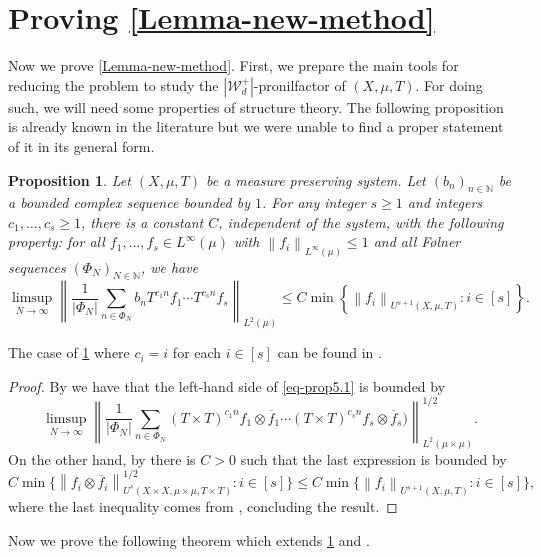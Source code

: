 \documentclass[letter,11pt]{article}
\newtheorem{prop}[theo]{Proposition}
\theoremstyle{definition}
\newcommand{\N}{\mathbb{N}}
\newcommand{\norm}[1]{\left\lVert#1\right\rVert}
\begin{document}
\section{Proving \cref{Lemma-new-method}}\label{sec5}
Now we prove \cref{Lemma-new-method}. First, we prepare the main tools for reducing the problem to study the $|\mathcal{W}_d^{+} |$-pronilfactor of $(X,\mu,T)$. For doing such, we will need some properties of structure theory. The following proposition is already known in the literature but we were unable to find a proper statement of it in its general form. 
\begin{prop}\label{W-erg-avera}
    Let $(X,\mu,T)$ be a measure preserving system. Let $(b_n)_{n\in \N}$ be a bounded complex sequence bounded by $1$. For any integer $s\geq 1$ and integers $c_1,\ldots,c_s\geq 1$, there is a constant $C$, independent of the system, with the following property: for all $f_1,\ldots,f_s\in L^\infty(\mu)$ with $\norm{f_i}_{L^\infty(\mu)}\leq 1$ and all F\o lner sequences $(\Phi_N)_{N\in \N}$, we have 
    \begin{equation}\label{eq-prop5.1}
      \limsup _{N \rightarrow \infty}\left\|\frac{1}{\left|\Phi_N\right|} \sum_{n \in \Phi_N} b_n T^{c_1 n} f_1 \cdots T^{c_s n} f_s\right\|_{L^2(\mu)} \leq C\min \left\{\left\|f_i\right\|_{U^{s+1}(X, \mu, T)}: i\in [s]\right\}.  
    \end{equation}
   $$ $$
\end{prop}
The case of \cref{W-erg-avera} where $c_i=i$ for each $i\in [s]$ can be found in \cite[Corollary 7.3]{MR2544760}.
\begin{proof}
By \cite[Lemma 6.10]{kmrr25} we have that the left-hand side of \cref{eq-prop5.1} is bounded by
$$
 \limsup _{N \rightarrow \infty}   \norm{\frac{1}{|\Phi_N|}\sum_{n\in \Phi_N}  (T\times T)^{c_1 n} f_1\otimes \overline{f}_1\cdots (T\times T) ^{c_s n} f_s\otimes \overline{f}_s)}_{L^2(\mu\times \mu)}^{1/2}.
$$
On the other hand, by \cite[Lemma 6.7, part (iii)]{kmrr25} there is $C>0$ such that the last expression is bounded by 
$$ C \min\{ \norm{f_i\otimes \overline{f}_i}_{U^s(X\times X,\mu\times \mu,T\times T)}^{1/2} : i\in [s]\} \leq  C \min\{ \norm{f_i}_{U^{s+1}(X,\mu,T)} : i\in [s]\} ,$$
where the last inequality comes from \cite[Lemma 6.7, part (i)]{kmrr25}, concluding the result.
\end{proof}

Now we prove the following theorem which extends \cref{W-erg-avera} and \cite[Theorem 6.6]{kmrr25}.
\end{document}
